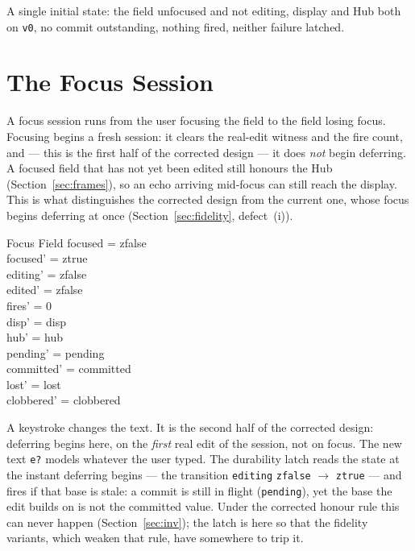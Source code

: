 \documentclass[a4paper,10pt,fleqn]{article}
\begin{document}
A single initial state: the field unfocused and not editing, display and Hub
both on \texttt{v0}, no commit outstanding, nothing fired, neither failure
latched.

\section{The Focus Session}

A focus session runs from the user focusing the field to the field losing focus.
Focusing begins a fresh session: it clears the real-edit witness and the fire
count, and --- this is the first half of the corrected design --- it does
\emph{not} begin deferring.  A focused field that has not yet been edited still
honours the Hub (Section~\ref{sec:frames}), so an echo arriving mid-focus can
still reach the display.  This is what distinguishes the corrected design from
the current one, whose focus begins deferring at once
(Section~\ref{sec:fidelity}, defect~(i)).

\begin{schema}{Focus}
  \Delta Field
\where
  focused = zfalse \\
  focused' = ztrue \\
  editing' = zfalse \\
  edited' = zfalse \\
  fires' = 0 \\
  disp' = disp \\
  hub' = hub \\
  pending' = pending \\
  committed' = committed \\
  lost' = lost \\
  clobbered' = clobbered
\end{schema}

A keystroke changes the text.  It is the second half of the corrected design:
deferring begins here, on the \emph{first} real edit of the session, not on
focus.  The new text \texttt{e?} models whatever the user typed.  The durability
latch reads the state at the instant deferring begins --- the transition
\texttt{editing} \texttt{zfalse} $\to$ \texttt{ztrue} --- and fires if that base
is stale: a commit is still in flight (\texttt{pending}), yet the base the edit
builds on is not the committed value.  Under the corrected honour rule this can
never happen (Section~\ref{sec:inv}); the latch is here so that the fidelity
variants, which weaken that rule, have somewhere to trip it.
\end{document}

